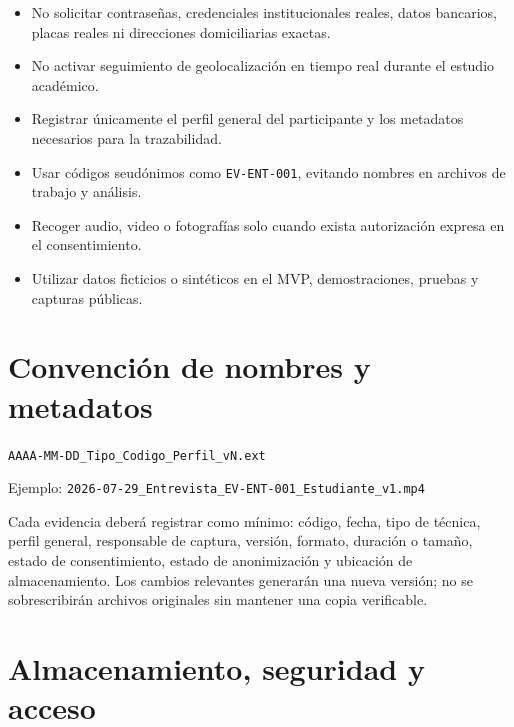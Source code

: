\documentclass[10pt,a4paper]{article}
\begin{document}
\begin{itemize}
  \item No solicitar contraseñas, credenciales institucionales reales, datos bancarios, placas reales ni direcciones domiciliarias exactas.
  \item No activar seguimiento de geolocalización en tiempo real durante el estudio académico.
  \item Registrar únicamente el perfil general del participante y los metadatos necesarios para la trazabilidad.
  \item Usar códigos seudónimos como \texttt{EV-ENT-001}, evitando nombres en archivos de trabajo y análisis.
  \item Recoger audio, video o fotografías solo cuando exista autorización expresa en el consentimiento.
  \item Utilizar datos ficticios o sintéticos en el MVP, demostraciones, pruebas y capturas públicas.
\end{itemize}

\section{Convención de nombres y metadatos}

\begin{InfoBox}
\texttt{AAAA-MM-DD\_Tipo\_Codigo\_Perfil\_vN.ext}

Ejemplo: \texttt{2026-07-29\_Entrevista\_EV-ENT-001\_Estudiante\_v1.mp4}
\end{InfoBox}

Cada evidencia deberá registrar como mínimo: código, fecha, tipo de técnica, perfil general, responsable de captura, versión, formato, duración o tamaño, estado de consentimiento, estado de anonimización y ubicación de almacenamiento. Los cambios relevantes generarán una nueva versión; no se sobrescribirán archivos originales sin mantener una copia verificable.

\section{Almacenamiento, seguridad y acceso}
\end{document}
